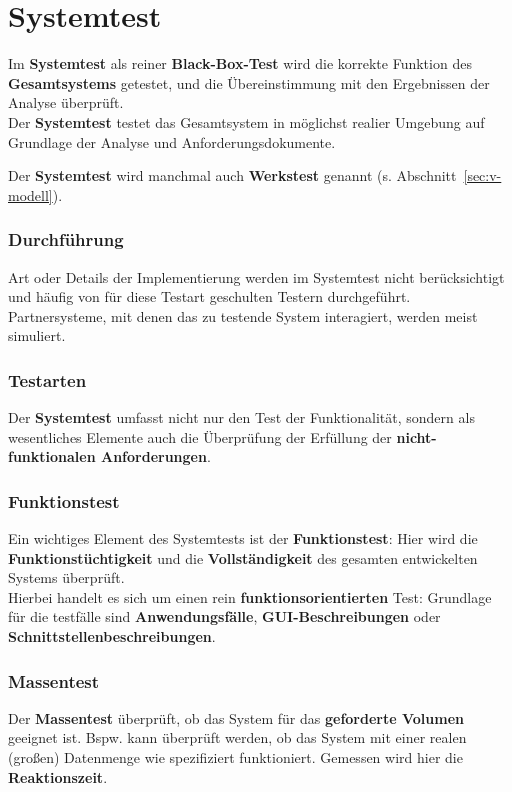 \section{Systemtest}

\begin{tcolorbox}[title=Systemtest]
    Im \textbf{Systemtest} als reiner \textbf{Black-Box-Test} wird die korrekte Funktion des \textbf{Gesamtsystems} getestet, und die Übereinstimmung mit den Ergebnissen der Analyse überprüft.\\
    Der \textbf{Systemtest} testet das Gesamtsystem in möglichst realier Umgebung auf Grundlage der Analyse und Anforderungsdokumente.
\end{tcolorbox}

\noindent
Der \textbf{Systemtest} wird manchmal auch \textbf{Werkstest} genannt (s. Abschnitt~\ref{sec:v-modell}).

\subsubsection*{Durchführung}
Art oder Details der Implementierung werden im Systemtest nicht berücksichtigt und häufig von für diese Testart geschulten Testern durchgeführt. Partnersysteme, mit denen das zu testende System interagiert, werden meist simuliert.

\subsubsection*{Testarten}
Der \textbf{Systemtest} umfasst nicht nur den Test der Funktionalität, sondern als wesentliches Elemente auch die Überprüfung der Erfüllung der \textbf{nicht-funktionalen Anforderungen}.

\subsubsection*{Funktionstest}
Ein wichtiges Element des Systemtests ist der \textbf{Funktionstest}: Hier wird die \textbf{Funktionstüchtigkeit} und die \textbf{Vollständigkeit} des gesamten entwickelten Systems überprüft.\\
Hierbei handelt es sich um einen rein \textbf{funktionsorientierten} Test: Grundlage für die testfälle sind \textbf{Anwendungsfälle}, \textbf{GUI-Beschreibungen} oder \textbf{Schnittstellenbeschreibungen}.

\subsubsection*{Massentest}
Der \textbf{Massentest} überprüft, ob das System für das \textbf{geforderte Volumen} geeignet ist.
Bspw. kann überprüft werden, ob das System mit einer realen (großen) Datenmenge wie spezifiziert funktioniert.
Gemessen wird hier die \textbf{Reaktionszeit}.

